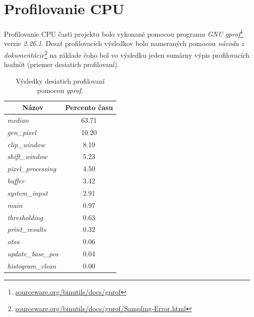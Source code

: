 \documentclass[11pt,a4paper]{article}
\begin{document}
\newpage
\section{Profilovanie CPU}

Profilovanie CPU časti projektu bolo vykonané pomocou programu \textit{GNU gprof}\footnote{\href{https://sourceware.org/binutils/docs/gprof/}{sourceware.org/binutils/docs/gprof}} verzie \textit{2.26.1}. Desať profilovacích výsledkov bolo nameraných pomocou \textit{návodu z dokumentácie}\footnote{\href{https://sourceware.org/binutils/docs/gprof/Sampling-Error.html}{sourceware.org/binutils/docs/gprof/Sampling-Error.html}} na základe čoho bol vo výsledku jeden sumárny výpis profilovacích hodnôt (priemer desiatich profilovaní).\\

\begin{table}[H]
  \begin{center}
    \begin{tabular}{l|c}
        \multicolumn{1}{c|}{\textbf{Názov}} & \multicolumn{1}{c}{\textbf{Percento času}}\\
        \hline
        \textit{median}            & 63.71 \\
        \textit{gen\_pixel}        & 10.20 \\
        \textit{clip\_window}      & 8.19  \\
        \textit{shift\_window}     & 5.23  \\
        \textit{pixel\_processing} & 4.50  \\
        \textit{buffer}            & 3.42  \\
        \textit{system\_input}     & 2.91  \\
        \textit{main}              & 0.97  \\
        \textit{thresholding}      & 0.63  \\
        \textit{print\_results}    & 0.32  \\
        \textit{otsu}              & 0.06  \\
        \textit{update\_base\_pos} & 0.04  \\
        \textit{histogram\_clean}  & 0.00  \\
    \end{tabular}
    \caption{Výsledky desiatich profilovaní pomocou \textit{gprof}.}
    \label{tab:gprof}
  \end{center}
\end{table}
\end{document}
